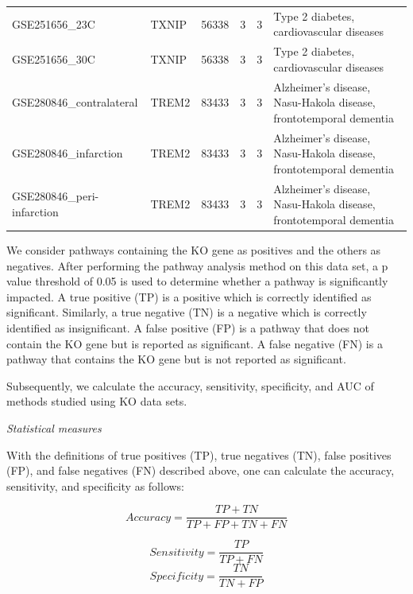 \begin{landscape}
\begin{longtable}{@{}llcccl@{}}
GSE251656\_23C		    	&TXNIP		&56338	&3	&3	&Type 2 diabetes, cardiovascular diseases \\	
GSE251656\_30C			&TXNIP		&56338	&3	&3	&Type 2 diabetes, cardiovascular diseases\\	
GSE280846\_contralateral	&TREM2		&83433	&3	&3	&Alzheimer’s disease,  Nasu-Hakola disease, frontotemporal dementia\\	
GSE280846\_infarction		&TREM2		&83433	&3	&3	&Alzheimer’s disease,  Nasu-Hakola disease, frontotemporal dementia \\	
GSE280846\_peri-infarction	&TREM2		&83433	&3	&3	&Alzheimer’s disease,  Nasu-Hakola disease, frontotemporal dementia\\	
\hline
 \end{longtable}
\end{landscape}

We consider pathways containing the KO gene as positives and the others as negatives. After performing the pathway analysis method on this data set, a p value threshold of 0.05 is used to determine whether a pathway is significantly impacted. A true positive (TP) is a positive which is correctly identified as significant. 
Similarly, a true negative (TN) is a negative which is correctly identified as insignificant.
A false positive (FP) is a pathway that does not contain the KO gene but is reported as significant. A false negative (FN) is a pathway that contains the KO gene but is not reported as significant.

Subsequently, we calculate the accuracy, sensitivity, specificity, and AUC of methods studied using  KO data sets.

\textit{Statistical measures} 

With the definitions of true positives (TP), true negatives (TN), false positives (FP), and false negatives (FN) described above, one can calculate the accuracy, sensitivity, and specificity as follows:

\begin{equation}
Accuracy = \frac{TP + TN}{TP + FP + TN + FN}
\end{equation}

\begin{equation}
Sensitivity = \frac{TP}{TP + FN}
\end{equation}
\begin{equation}
Specificity = \frac{TN}{TN + FP}
\end{equation}


